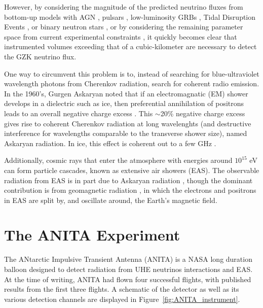 However, by considering the magnitude of the predicted neutrino fluxes from bottom-up models with AGN \cite{Murase:2015ndr, Murase:2014foa}, pulsars \cite{Fang:2013vla}, low-luminosity GRBs \cite{Boncioli:2018lrv}, Tidal Disruption Events \cite{Biehl:2017hnb}, or binary neutron stars \cite{Fang:2017tla}, or by considering the remaining parameter space from current experimental constraints \cite{Kotera:2010yn, Ahlers:2010fw, Ahlers:2012rz, Heinze:2019jou}, it quickly becomes clear that instrumented volumes exceeding that of a cubic-kilometer are necessary to detect the GZK neutrino flux. 

One way to circumvent this problem is to, instead of searching for blue-ultraviolet wavelength photons from Cherenkov radiation, search for coherent radio emission. In the 1960's, Gurgen Askaryan noted that if an electromagnatic (EM) shower develops in a dielectric such as ice, then preferential annihilation of positrons leads to an overall negative charge excess \cite{Askaryan:1962hbi}. This $\sim$20\% negative charge excess gives rise to coherent Cherenkov radiation at long wavelenghts (and destructive interference for wavelengths comparable to the transverse shower size), named Askaryan radiation. In ice, this effect is coherent out to a few GHz \cite{Gorham:2006fy}.

Additionally, cosmic rays that enter the atmosphere with energies around $10^{15}$ eV can form particle cascades, known as extensive air showers (EAS). The observable radiation from EAS is in part due to Askaryan radiation \cite{Aab:2014esa}, though the dominant contribution is from geomagnetic radiation \cite{Kahn:1966}, in which the electrons and positrons in EAS are split by, and oscillate around, the Earth's magnetic field. 



\section{The ANITA Experiment}
\label{sec:ANITA:detector}
The ANtarctic Impulsive Transient Antenna (ANITA) is a NASA long duration balloon designed to detect radiation from UHE neutrinos interactions and EAS. At the time of writing, ANITA had flown four successful flights, with published results from the first three flights. A schematic of the detector as well as its various detection channels are displayed in Figure~\ref{fig:ANITA_instrument}. 

